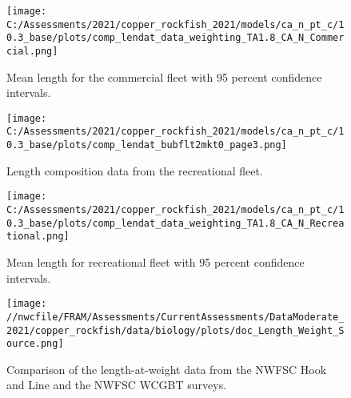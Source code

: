 \documentclass[11pt,
  english,
  a4paper,
]{article}
\begin{document}
\tagmcend\tagstructend


\begin{figure}
\centering
\texttt{[image: C:/Assessments/2021/copper\_rockfish\_2021/models/ca\_n\_pt\_c/10.3\_base/plots/comp\_lendat\_data\_weighting\_TA1.8\_CA\_N\_Commercial.png]}
\caption{Mean length for the commercial fleet with 95 percent confidence intervals.\label{fig:mean-com-len-data}}
\end{figure}

\tagmcend\tagstructend


\begin{figure}
\centering
\texttt{[image: C:/Assessments/2021/copper\_rockfish\_2021/models/ca\_n\_pt\_c/10.3\_base/plots/comp\_lendat\_bubflt2mkt0\_page3.png]}
\caption{Length composition data from the recreational fleet.\label{fig:rec-len-data}}
\end{figure}

\tagmcend\tagstructend


\begin{figure}
\centering
\texttt{[image: C:/Assessments/2021/copper\_rockfish\_2021/models/ca\_n\_pt\_c/10.3\_base/plots/comp\_lendat\_data\_weighting\_TA1.8\_CA\_N\_Recreational.png]}
\caption{Mean length for recreational fleet with 95 percent confidence intervals.\label{fig:mean-rec-len-data}}
\end{figure}

\tagmcend\tagstructend


\begin{figure}
\centering
\texttt{[image: //nwcfile/FRAM/Assessments/CurrentAssessments/DataModerate\_2021/copper\_rockfish/data/biology/plots/doc\_Length\_Weight\_Source.png]}
\caption{Comparison of the length-at-weight data from the NWFSC Hook and Line and the NWFSC WCGBT surveys.\label{fig:len-weight-survey}}
\end{figure}

\tagmcend\tagstructend

\end{document}
